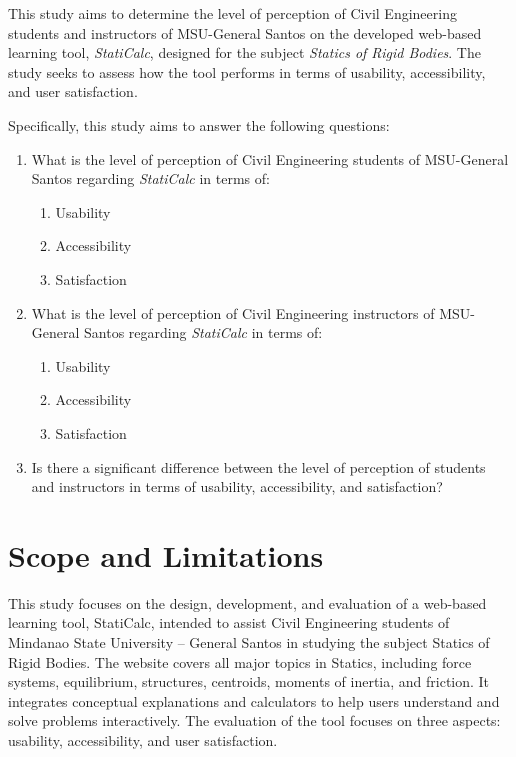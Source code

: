 This study aims to determine the level of perception of Civil Engineering students and instructors of MSU-General Santos on the developed web-based learning tool, \textit{StatiCalc}, designed for the subject \textit{Statics of Rigid Bodies}. The study seeks to assess how the tool performs in terms of usability, accessibility, and user satisfaction.

Specifically, this study aims to answer the following questions:

\begin{enumerate}
    \item What is the level of perception of Civil Engineering students of MSU-General Santos regarding \textit{StatiCalc} in terms of:
    \begin{enumerate}[label*=\alph*.]
        \item Usability
        \item Accessibility
        \item Satisfaction
    \end{enumerate}

    \item What is the level of perception of Civil Engineering instructors of MSU-General Santos regarding \textit{StatiCalc} in terms of:
    \begin{enumerate}[label*=\alph*.]
        \item Usability
        \item Accessibility
        \item Satisfaction
    \end{enumerate}

    \item Is there a significant difference between the level of perception of students and instructors in terms of usability, accessibility, and satisfaction?
\end{enumerate}

\section{Scope and Limitations}\label{sec:1-sal}
This study focuses on the design, development, and evaluation of a web-based learning tool, StatiCalc, intended to assist Civil Engineering students of Mindanao State University – General Santos in studying the subject Statics of Rigid Bodies. The website covers all major topics in Statics, including force systems, equilibrium, structures, centroids, moments of inertia, and friction. It integrates conceptual explanations and calculators to help users understand and solve problems interactively. The evaluation of the tool focuses on three aspects: usability, accessibility, and user satisfaction.

